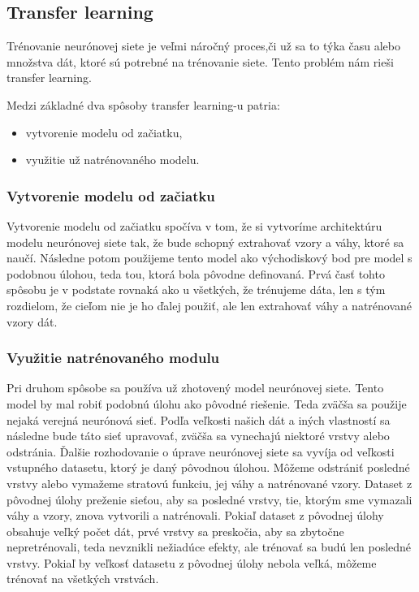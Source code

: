 \subsection{Transfer learning} \label{transferlearning}

\hspace{10mm}Trénovanie neurónovej siete je veľmi náročný proces,či už sa to týka času alebo množstva dát, ktoré sú potrebné na trénovanie siete. Tento problém nám rieši transfer learning.

Medzi základné dva spôsoby transfer learning-u patria:
\begin{itemize}
	\item vytvorenie modelu od začiatku,
	\item využitie už natrénovaného modelu.
\end{itemize}

\subsubsection{Vytvorenie modelu od začiatku}
\hspace{10mm}Vytvorenie modelu od začiatku spočíva v tom, že si vytvoríme architektúru modelu neurónovej siete tak, že bude schopný extrahovať vzory a váhy, ktoré sa naučí. Následne potom použijeme tento model ako východiskový bod pre model s podobnou úlohou, teda tou, ktorá bola pôvodne definovaná. Prvá časť tohto spôsobu je v podstate rovnaká ako u všetkých, že trénujeme dáta, len s tým rozdielom, že cieľom nie je ho ďalej použiť, ale len extrahovať váhy a natrénované vzory dát. \cite{pan2008transfer,What-is-Transfer-Learning}

\subsubsection{Využitie natrénovaného modulu}
\hspace{10mm}Pri druhom spôsobe sa používa už zhotovený model neurónovej siete. Tento model by mal robiť podobnú úlohu ako pôvodné riešenie. Teda zväčša sa použije nejaká verejná neurónová sieť. Podľa veľkosti našich dát a iných vlastností sa následne bude táto sieť upravovať, zväčša sa vynechajú niektoré vrstvy alebo odstránia. Ďalšie rozhodovanie o úprave neurónovej siete sa vyvíja od veľkosti vstupného datasetu, ktorý je daný pôvodnou úlohou. Môžeme odstrániť posledné vrstvy alebo vymažeme stratovú funkciu, jej váhy a natrénované vzory.  Dataset  z pôvodnej úlohy  preženie sieťou, aby sa posledné vrstvy, tie, ktorým sme vymazali váhy a vzory, znova vytvorili a natrénovali. Pokiaľ dataset z pôvodnej úlohy obsahuje veľký počet dát, prvé vrstvy sa preskočia, aby sa zbytočne nepretrénovali, teda nevznikli nežiadúce efekty, ale trénovať sa budú len posledné vrstvy. Pokiaľ by veľkosť datasetu z pôvodnej úlohy nebola veľká, môžeme trénovať na všetkých vrstvách. \cite{pan2008transfer,What-is-Transfer-Learning}

